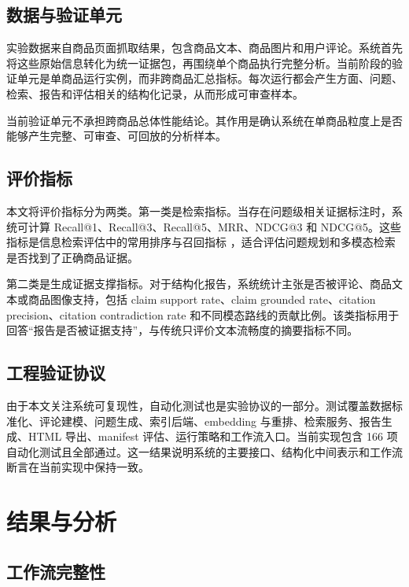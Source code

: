 \documentclass[11pt]{article}
\begin{document}
\subsection{数据与验证单元}

实验数据来自商品页面抓取结果，包含商品文本、商品图片和用户评论。系统首先将这些原始信息转化为统一证据包，再围绕单个商品执行完整分析。当前阶段的验证单元是单商品运行实例，而非跨商品汇总指标。每次运行都会产生方面、问题、检索、报告和评估相关的结构化记录，从而形成可审查样本。

当前验证单元不承担跨商品总体性能结论。其作用是确认系统在单商品粒度上是否能够产生完整、可审查、可回放的分析样本。

\subsection{评价指标}

本文将评价指标分为两类。第一类是检索指标。当存在问题级相关证据标注时，系统可计算 Recall@1、Recall@3、Recall@5、MRR、NDCG@3 和 NDCG@5。这些指标是信息检索评估中的常用排序与召回指标 \citep{manning2008introductionIr}，适合评估问题规划和多模态检索是否找到了正确商品证据。

第二类是生成证据支撑指标。对于结构化报告，系统统计主张是否被评论、商品文本或商品图像支持，包括 claim support rate、claim grounded rate、citation precision、citation contradiction rate 和不同模态路线的贡献比例。该类指标用于回答``报告是否被证据支持''，与传统只评价文本流畅度的摘要指标不同。

\subsection{工程验证协议}

由于本文关注系统可复现性，自动化测试也是实验协议的一部分。测试覆盖数据标准化、评论建模、问题生成、索引后端、embedding 与重排、检索服务、报告生成、HTML 导出、manifest 评估、运行策略和工作流入口。当前实现包含 166 项自动化测试且全部通过。这一结果说明系统的主要接口、结构化中间表示和工作流断言在当前实现中保持一致。

\section{结果与分析}
\subsection{工作流完整性}
\end{document}
